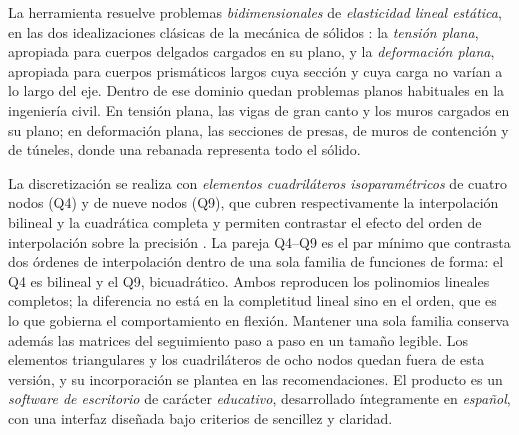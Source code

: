 La herramienta resuelve problemas \emph{bidimensionales} de \emph{elasticidad lineal estática}, en las dos idealizaciones clásicas de la mecánica de sólidos \autocite[p.~11]{timoshenko1970elasticity}: la \emph{tensión plana}, apropiada para cuerpos delgados cargados en su plano, y la \emph{deformación plana}, apropiada para cuerpos prismáticos largos cuya sección y cuya carga no varían a lo largo del eje. Dentro de ese dominio quedan problemas planos habituales en la ingeniería civil. En tensión plana, las vigas de gran canto y los muros cargados en su plano; en deformación plana, las secciones de presas, de muros de contención y de túneles, donde una rebanada representa todo el sólido.

La discretización se realiza con \emph{elementos cuadriláteros isoparamétricos} de cuatro nodos (Q4) y de nueve nodos (Q9), que cubren respectivamente la interpolación bilineal y la cuadrática completa y permiten contrastar el efecto del orden de interpolación sobre la precisión \autocites[pp.~137-138]{hughes2000fem}[pp.~164, 183-184]{onate2009structural}. La pareja Q4--Q9 es el par mínimo que contrasta dos órdenes de interpolación dentro de una sola familia de funciones de forma: el Q4 es bilineal y el Q9, bicuadrático. Ambos reproducen los polinomios lineales completos; la diferencia no está en la completitud lineal sino en el orden, que es lo que gobierna el comportamiento en flexión. Mantener una sola familia conserva además las matrices del seguimiento paso a paso en un tamaño legible. Los elementos triangulares y los cuadriláteros de ocho nodos quedan fuera de esta versión, y su incorporación se plantea en las recomendaciones. El producto es un \emph{software de escritorio} de carácter \emph{educativo}, desarrollado íntegramente en \emph{español}, con una interfaz diseñada bajo criterios de sencillez y claridad.

